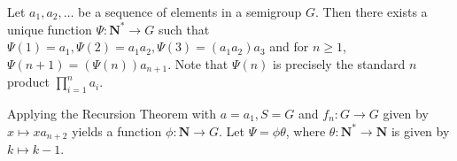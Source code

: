 $$ $$

\begin{ex}
    Let $a_1, a_2,\dots$ be a sequence of elements in a semigroup $G$. Then there exists a unique function $\Psi: \mathbf{N^*}\rightarrow G$ such that $\Psi(1)=a_1, \Psi(2)=a_1a_2, \Psi(3)=(a_1a_2)a_3$ and for $n\geq 1$, $\Psi(n+1)=(\Psi(n))a_{n+1}$. Note that $\Psi(n)$ is precisely the standard $n$ product $\prod_{i=1}^na_i$.
\end{ex}

\begin{answer}
    Applying the Recursion Theorem with $a=a_1, S=G$ and $f_n:G\to G$ given by $x\mapsto xa_{n+2}$ yields a function $\phi: \mathbf{N}\to G$. Let $\Psi=\phi\theta$, where $\theta:\mathbf{N^*}\to \mathbf{N}$ is given by $k\mapsto k-1$.
\end{answer}